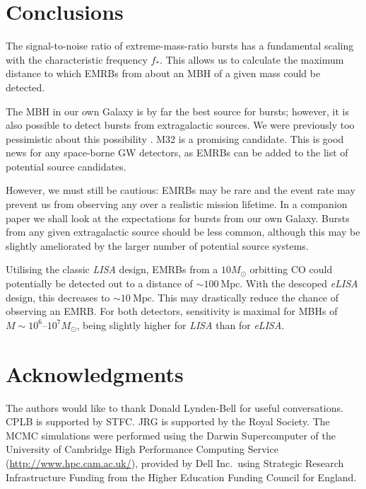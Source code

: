 \documentclass[useAMS,usedcolumn,usegraphicx,usenatbib]{mn2e}
\newcommand{\units}[1]{\ensuremath{~\mathrm{#1}}}
\begin{document}
\section{Conclusions}

The signal-to-noise ratio of extreme-mass-ratio bursts has a fundamental scaling with the characteristic frequency $f_\ast$. This allows us to calculate the maximum distance to which EMRBs from about an MBH of a given mass could be detected.

The MBH in our own Galaxy is by far the best source for bursts; however, it is also possible to detect bursts from extragalactic sources. We were previously too pessimistic about this possibility \citep{Berry2013}. M32 is a promising candidate. This is good news for any space-borne GW detectors, as EMRBs can be added to the list of potential source candidates.

However, we must still be cautious: EMRBs may be rare and the event rate may prevent us from observing any over a realistic mission lifetime. In a companion paper we shall look at the expectations for bursts from our own Galaxy. Bursts from any given extragalactic source should be less common, although this may be slightly ameliorated by the larger number of potential source systems.

Utilising the classic \textit{LISA} design, EMRBs from a $10 M_\odot$ orbitting CO could potentially be detected out to a distance of $\sim 100\units{Mpc}$. With the descoped \textit{eLISA} design, this decreases to $\sim 10\units{Mpc}$. This may drastically reduce the chance of observing an EMRB. For both detectors, sensitivity is maximal for MBHs of $M \sim 10^6$--$10^7 M_\odot$, being slightly higher for \textit{LISA} than for \textit{eLISA}.

\section*{Acknowledgments}

The authors would like to thank Donald Lynden-Bell for useful conversations. CPLB is supported by STFC. JRG is supported by the Royal Society. The MCMC simulations were performed using the Darwin Supercomputer of the University of Cambridge High Performance Computing Service (\url{http://www.hpc.cam.ac.uk/}), provided by Dell Inc.\ using Strategic Research Infrastructure Funding from the Higher Education Funding Council for England.




\bsp

\label{lastpage}
\end{document}
